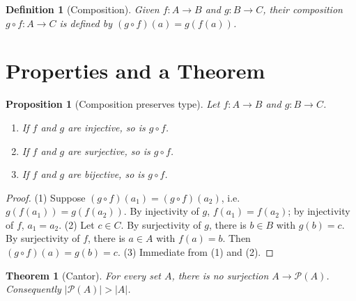 \documentclass[11pt]{article}
\newtheorem{definition}{Definition}
\newtheorem{theorem}{Theorem}
\newtheorem{proposition}{Proposition}
\begin{document}
\begin{definition}[Composition]
Given $f : A \to B$ and $g : B \to C$, their \emph{composition} $g \circ f : A \to C$ is defined by $(g \circ f)(a) = g(f(a))$.
\end{definition}

\section*{Properties and a Theorem}

\begin{proposition}[Composition preserves type]
\label{prop:composition}
Let $f : A \to B$ and $g : B \to C$.
\begin{enumerate}
  \item If $f$ and $g$ are injective, so is $g \circ f$.
  \item If $f$ and $g$ are surjective, so is $g \circ f$.
  \item If $f$ and $g$ are bijective, so is $g \circ f$.
\end{enumerate}
\end{proposition}

\begin{proof}
(1) Suppose $(g \circ f)(a_1) = (g \circ f)(a_2)$, i.e.\ $g(f(a_1)) = g(f(a_2))$. By injectivity of $g$, $f(a_1) = f(a_2)$; by injectivity of $f$, $a_1 = a_2$.
(2) Let $c \in C$. By surjectivity of $g$, there is $b \in B$ with $g(b) = c$. By surjectivity of $f$, there is $a \in A$ with $f(a) = b$. Then $(g \circ f)(a) = g(b) = c$.
(3) Immediate from (1) and (2).
\end{proof}

\begin{theorem}[Cantor]
\label{thm:cantor}
For every set $A$, there is no surjection $A \to \mathcal{P}(A)$. Consequently $|\mathcal{P}(A)| > |A|$.
\end{theorem}
\end{document}
